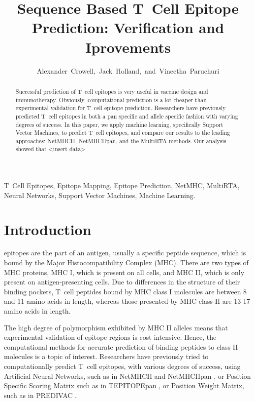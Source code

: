 \documentclass[journal]{IEEEtran}
\begin{document}
\title{Sequence Based T~Cell Epitope Prediction: Verification and Iprovements}

\author{Alexander~Crowell,~Jack~Holland,~and~Vineetha~Paruchuri}


\maketitle


\begin{abstract}
Successful prediction of T~cell epitopes is very useful in vaccine design and immunotherapy. Obviously, computational prediction is a lot cheaper than experimental validation for T~cell epitope prediction. Researchers have previously predicted T~cell epitopes in both a pan specific and allele specific fashion with varying degrees of success. In this paper, we apply machine learning, specifically Support Vector Machines, to predict T~cell epitopes, and compare our results to the leading approaches: NetMHCII, NetMHCIIpan, and the MultiRTA methods. Our analysis showed that <insert data> 
\end{abstract}


\begin{IEEEkeywords}
T~Cell Epitopes, Epitope Mapping, Epitope Prediction, NetMHC, MultiRTA, Neural Networks, Support Vector Machines, Machine Learning.
\end{IEEEkeywords}





\section{Introduction}

 epitopes are the part of an antigen, usually a specific peptide sequence, which is bound by the Major Histocompatibility Complex (MHC). There are two types of MHC proteins, MHC I, which is present on all cells, and MHC II, which is only present on antigen-presenting cells. Due to differences in the structure of their binding pockets, T~cell peptides bound by MHC class I molecules are between 8 and 11 amino acids in length, whereas those presented by MHC class II are 13-17 amino acids in length. 

The high degree of polymorphism exhibited by MHC II alleles means that experimental validation of epitope regions is cost intensive. Hence, the computational methods for accurate prediction of binding peptides to class II molecules is a topic of interest. Researchers have previously tried to computationally predict T~cell epitopes, with various degrees of success, using Artificial Neural Networks, such as in NetMHCII \cite{NetMHCII} and NetMHCIIpan \cite{NetMHCIIpan}, or Position Specific Scoring Matrix \cite{PSSM} such as in TEPITOPEpan \cite{TEPITOPEpan}, or Position Weight Matrix, such as in PREDIVAC \cite{PREDIVAC}. 
\end{document}
